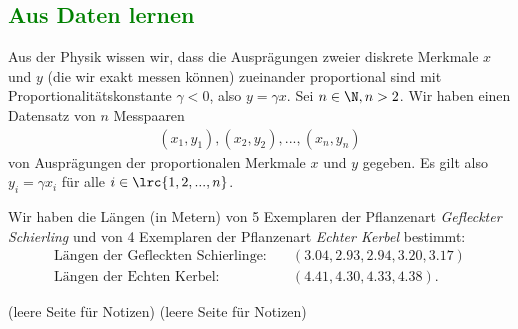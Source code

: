 \begin{questions}
	\clearpage
	\section*{\textcolor{Green}{Aus Daten lernen}}

	Aus der Physik wissen wir, dass die Ausprägungen zweier diskrete Merkmale $x$ und $y$ (die wir exakt messen können) zueinander proportional sind mit Proportionalitätskonstante $\gamma < 0$, also $y=\gamma x$. Sei $n\in\N, n>2$. Wir haben einen Datensatz von $n$ Messpaaren
	\begin{align*}
		(x_1,y_1),(x_2,y_2),...,(x_n,y_n)
	\end{align*}
	von Ausprägungen der proportionalen Merkmale $x$ und $y$ gegeben. Es gilt also $y_i = \gamma x_i$ für alle $i\in\lrc{1,2,...,n}$.
	\droptotalpoints

	\clearpage

	Wir haben die Längen (in Metern) von 5 Exemplaren der Pflanzenart \textit{Gefleckter Schierling} und von 4 Exemplaren der Pflanzenart \textit{Echter Kerbel} bestimmt:
	\begin{align*}
		\text{Längen der Gefleckten Schierlinge:}\quad & (3.04, 2.93, 2.94, 3.20, 3.17) \\
		\text{Längen der Echten Kerbel:}\quad          & (4.41, 4.30, 4.33, 4.38).
	\end{align*}

	\droptotalpoints
\end{questions}

\clearpage
(leere Seite für Notizen)
\clearpage
(leere Seite für Notizen)
